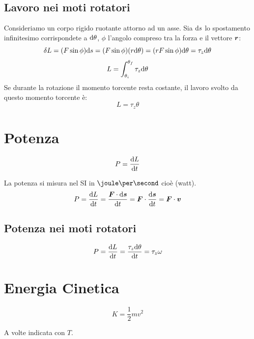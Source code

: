 \subsection{Lavoro nei moti rotatori}
Consideriamo un corpo rigido ruotante attorno ad un asse. Sia $\mathrm{d} s$ lo spostamento
infinitesimo corrispondete a $\mathrm{d} \theta$, $\phi$ l'angolo
compreso tra la forza e il vettore $\boldsymbol{r}$:
\begin{equation*}
\delta L=(F\sin \phi)\mathrm{d} s=(F \sin \phi)(r
\mathrm{d}\theta)=(rF\sin\phi)\mathrm{d} \theta=\tau_z\mathrm{d}\theta
\end{equation*}
\begin{equation*}L=\int_{\theta_i}^{\theta_f}\tau_z\mathrm{d}\theta\end{equation*}
Se durante la rotazione il momento torcente resta costante, il
lavoro svolto da questo momento torcente è:
\begin{equation*}L=\tau_z\theta\end{equation*}
\section{Potenza}
\begin{Def}[potenza]
 \begin{equation*}P=\frac{\mathrm{d} L}{\mathrm{d} t}\end{equation*}
\end{Def}
La potenza si misura nel SI in $\joule\per\second$ cioè \watt(watt).
$$P=\frac{\mathrm{d} L}{\mathrm{d} t}=\frac{\boldsymbol{F}\cdot\mathrm{d} \boldsymbol{s}}{\mathrm{d} t}=\boldsymbol{F}\cdot\frac{\mathrm{d} \boldsymbol{s}}{\mathrm{d}
t}=\boldsymbol{F}\cdot \boldsymbol{v}$$
\subsection{Potenza nei moti rotatori}
$$P=\frac{\mathrm{d} L}{\mathrm{d} t}=\frac{\tau_z\mathrm{d}\theta}{\mathrm{d}
t}=\tau_z\omega$$

\section[Energia Cinetica]{Energia Cinetica}
\begin{Def}
\begin{equation*}K=\frac{1}{2}mv^2\end{equation*}
\end{Def}
A volte indicata con $T$.
